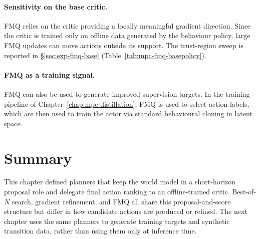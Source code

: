 \paragraph{Sensitivity on the base critic.}
FMQ relies on the critic providing a locally meaningful gradient
direction. Since the critic is trained only on offline data generated by
the behaviour policy, large FMQ updates can move actions outside its
support. The trust-region sweep is reported in \S\ref{sec:exp-fmq-base}
(Table~\ref{tab:mpc-fmq-basepolicy}).

\paragraph{FMQ as a training signal.}
FMQ can also be used to generate improved supervision targets.
In the training pipeline of Chapter~\ref{chap:mpc-distillation},
FMQ is used to select action labels, which are then used to train the
actor via standard behavioural cloning in latent space.

\section{Summary}

This chapter defined planners that keep the world model in a
short-horizon proposal role and delegate final action ranking to an
offline-trained critic. Best-of-$N$ search, gradient refinement, and FMQ
all share this proposal-and-score structure but differ in how candidate
actions are produced or refined. The next chapter uses the same planners
to generate training targets and synthetic transition data, rather than
using them only at inference time.
